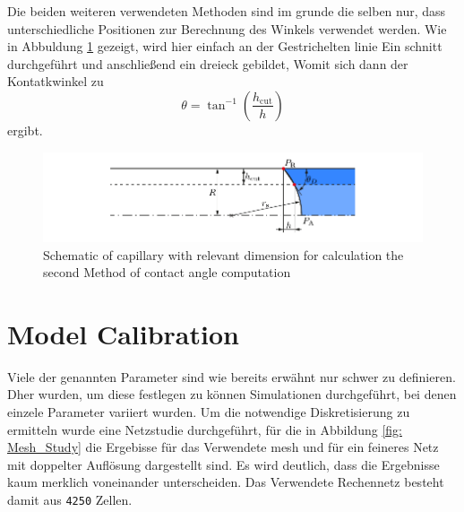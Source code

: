 Die beiden weiteren verwendeten Methoden sind im grunde die selben nur, dass unterschiedliche Positionen zur Berechnung des Winkels verwendet werden. Wie in Abbuldung \ref{fig: CA_Method2} gezeigt, wird hier einfach an der Gestrichelten linie Ein schnitt durchgeführt und anschließend ein dreieck gebildet, Womit sich dann der Kontatkwinkel zu
\begin{equation}
    \theta = \tan^{-1}\left(\frac{h_{\mathrm{cut}}}{h}\right)
\end{equation}
ergibt.

\begin{figure}[h]
    \centering
    \includegraphics[width=.95\textwidth]{Pictures/CA_CALCMEthod2.pdf}
    \caption{Schematic of capillary with relevant dimension for calculation the second Method of contact angle computation}
    \label{fig: CA_Method2}
\end{figure}


\section{Model Calibration}
Viele der genannten Parameter sind wie bereits erwähnt nur schwer zu definieren. Dher wurden, um diese festlegen zu können Simulationen durchgeführt, bei denen einzele Parameter variiert wurden. Um die notwendige Diskretisierung zu ermitteln wurde eine Netzstudie durchgeführt, für die in Abbildung \ref*{fig: Mesh_Study} die Ergebisse für das Verwendete mesh und für ein feineres Netz mit doppelter Auflösung dargestellt sind. Es wird deutlich, dass die Ergebnisse kaum merklich voneinander unterscheiden. Das Verwendete Rechennetz besteht damit aus \texttt{4250} Zellen. 

